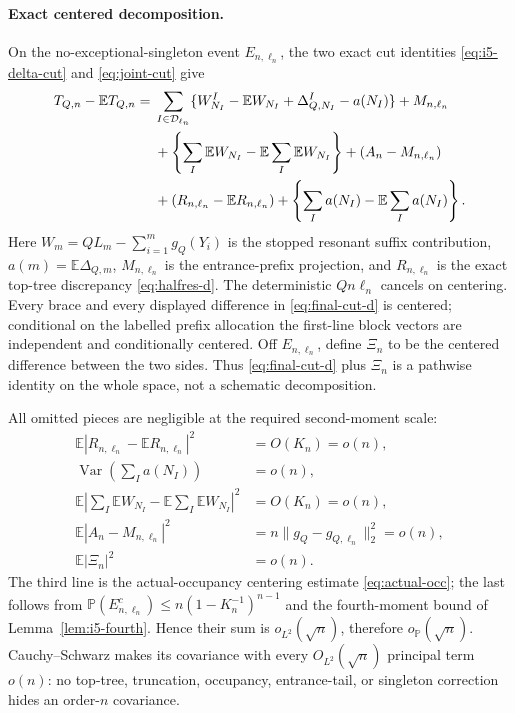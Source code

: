 \documentclass[11pt]{article}
\numberwithin{equation}{section}
\newcommand{\E}{\mathbb E}\newcommand{\Pp}{\mathbb P}
\newcommand{\Var}{\operatorname{Var}}\newcommand{\Cov}{\operatorname{Cov}}
\newcommand{\1}{\mathbf 1}\newcommand{\F}{\mathcal F}\newcommand{\D}{\mathcal D}
\begin{document}
\paragraph{Exact centered decomposition.}
On the no-exceptional-singleton event $E_{n,\ell_n}$, the two exact cut
identities \eqref{eq:i5-delta-cut} and \eqref{eq:joint-cut} give
\begin{align}
 T_{Q,n}-\E T_{Q,n}
={}&\sum_{I\in\mathcal D_{\ell_n}}
 \{W_{N_I}^{I}-\E W_{N_I}+\Delta_{Q,N_I}^{I}-a(N_I)\}
       +M_{n,\ell_n}                                           \notag\\
 &+\left\{\sum_I\E W_{N_I}-\E\sum_I\E W_{N_I}\right\}
   +(A_n-M_{n,\ell_n})                                         \notag\\
 &+(R_{n,\ell_n}-\E R_{n,\ell_n})
   +\left\{\sum_Ia(N_I)-\E\sum_Ia(N_I)\right\}.       \label{eq:final-cut-d}
\end{align}
Here $W_m=QL_m-\sum_{i=1}^mg_Q(Y_i)$ is the stopped resonant suffix
contribution, $a(m)=\E\Delta_{Q,m}$, $M_{n,\ell_n}$ is the entrance-prefix
projection, and $R_{n,\ell_n}$ is the exact top-tree discrepancy
\eqref{eq:halfres-d}.  The deterministic $Qn\ell_n$ cancels on centering.
Every brace and every displayed difference in \eqref{eq:final-cut-d} is
centered; conditional on the labelled prefix allocation the first-line block
vectors are independent and conditionally centered.  Off $E_{n,\ell_n}$,
define $\Xi_n$ to be the centered difference between the two sides.  Thus
\eqref{eq:final-cut-d} plus $\Xi_n$ is a pathwise identity on the whole
space, not a schematic decomposition.

All omitted pieces are negligible at the required second-moment scale:
\begin{align*}
 \E|R_{n,\ell_n}-\E R_{n,\ell_n}|^2&=O(K_n)=o(n),\\
 \Var\!\left(\sum_Ia(N_I)\right)&=o(n),\\
 \E\left|\sum_I\E W_{N_I}-\E\sum_I\E W_{N_I}\right|^2
     &=O(K_n)=o(n),\\
 \E|A_n-M_{n,\ell_n}|^2
     &=n\|g_Q-g_{Q,\ell_n}\|_2^2=o(n),\\
 \E|\Xi_n|^2&=o(n).
\end{align*}
The third line is the actual-occupancy centering estimate
\eqref{eq:actual-occ}; the last follows from
$\Pp(E_{n,\ell_n}^c)\le n(1-K_n^{-1})^{n-1}$ and the fourth-moment bound of Lemma~\ref{lem:i5-fourth}.  Hence their sum is $o_{L^2}(\sqrt n)$, therefore
$o_{\Pp}(\sqrt n)$.  Cauchy--Schwarz makes its covariance with every
$O_{L^2}(\sqrt n)$ principal term $o(n)$: no top-tree, truncation,
occupancy, entrance-tail, or singleton correction hides an order-$n$
covariance.
\end{document}
